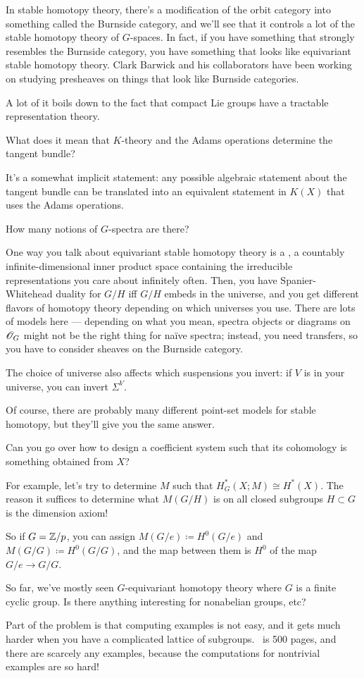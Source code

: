 In stable homotopy theory, there's a modification of the orbit category into something called the Burnside
category, and we'll see that it controls a lot of the stable homotopy theory of $G$-spaces. In fact, if you have
something that strongly resembles the Burnside category, you have something that looks like equivariant stable
homotopy theory. Clark Barwick and his collaborators have been working on studying presheaves on things that look
like Burnside categories.

A lot of it boils down to the fact that compact Lie groups have a tractable representation theory.
\begin{ques}
What does it mean that $K$-theory and the Adams operations determine the tangent bundle?
\end{ques}
It's a somewhat implicit statement: any possible algebraic statement about the tangent bundle can be translated
into an equivalent statement in $K(X)$ that uses the Adams operations.
\begin{ques}
How many notions of $G$-spectra are there?
\end{ques}
One way you talk about equivariant stable homotopy theory is a , a countably infinite-dimensional
inner product space containing the irreducible representations you care about infinitely often. Then, you have
Spanier-Whitehead duality for $G/H$ iff $G/H$ embeds in the universe, and you get different flavors of homotopy
theory depending on which universes you use. There are lots of models here --- depending on what you mean, spectra
objects or diagrams on $\mathscr O_G$ might not be the right thing for naïve spectra; instead, you need transfers, so you
have to consider sheaves on the Burnside category.

The choice of universe also affects which suspensions you invert: if $V$ is in your universe, you can invert
$\Sigma^V$.

Of course, there are probably many different point-set models for stable homotopy, but they'll give you the same
answer.
\begin{ques}
Can you go over how to design a coefficient system such that its cohomology is something obtained from $X$?
\end{ques}
For example, let's try to determine $M$ such that $H_G^*(X;M)\cong H^*(X)$. The reason it suffices to determine
what $M(G/H)$ is on all closed subgroups $H\subset G$ is the dimension axiom!

So if $G = \mathbb Z/p$, you can assign $M(G/e) \coloneqq H^0(G/e)$ and $M(G/G) \coloneqq H^0(G/G)$, and the map between
them is $H^0$ of the map $G/e\to G/G$.
\begin{ques}
So far, we've mostly seen $G$-equivariant homotopy theory where $G$ is a finite cyclic group. Is there anything
interesting for nonabelian groups, etc?
\end{ques}
Part of the problem is that computing examples is not easy, and it gets much harder when you have a complicated
lattice of subgroups.~\cite{LMS} is 500 pages, and there are scarcely any examples, because the computations for
nontrivial examples are so hard!

